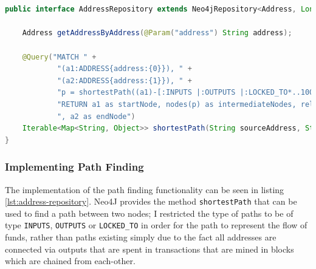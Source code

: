 \begin{lstlisting}[language=Java, label={lst:address-repository}, caption={AddressRepository interface definition}, breaklines=true, basicstyle=\small]


public interface AddressRepository extends Neo4jRepository<Address, Long> {

    Address getAddressByAddress(@Param("address") String address);

    @Query("MATCH " +
            "(a1:ADDRESS{address:{0}}), " +
            "(a2:ADDRESS{address:{1}}), " +
            "p = shortestPath((a1)-[:INPUTS |:OUTPUTS |:LOCKED_TO*..100]-(a2)) " +
            "RETURN a1 as startNode, nodes(p) as intermediateNodes, relationships(p) as rels" +
            ", a2 as endNode")
    Iterable<Map<String, Object>> shortestPath(String sourceAddress, String destinationAddress);
}
\end{lstlisting}

\subsubsection{Implementing Path Finding}
The implementation of the path finding functionality can be seen in listing \ref{lst:address-repository}. Neo4J provides the method \texttt{shortestPath} that can be used to find a path between two nodes; I restricted the type of paths to be of type \texttt{INPUTS}, \texttt{OUTPUTS} or \texttt{LOCKED\_TO} in order for the path to represent the flow of funds, rather than paths existing simply due to the fact all addresses are connected via outputs that are spent in transactions that are mined in blocks which are chained from each-other.




